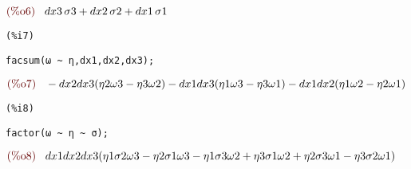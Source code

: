 \noindent
\begin{math}\displaystyle
\parbox{8ex}{\color{labelcolor}(\%o6) }
dx3\,\sigma3+dx2\,\sigma2+dx1\,\sigma1
\end{math}


\noindent
\begin{minipage}[t]{8ex}
\color{red}\bf
\begin{verbatim}
(%i7) 
\end{verbatim}
\end{minipage}
\begin{minipage}[t]{\textwidth}
\color{blue}
\begin{verbatim}
facsum(ω ~ η,dx1,dx2,dx3);
\end{verbatim}
\end{minipage}
\begin{math}\displaystyle
\parbox{8ex}{\color{labelcolor}(\%o7) }
-dx2dx3( \eta2\omega3-\eta3\omega2) -dx1dx3( \eta1\omega3-\eta3\omega1) -dx1dx2( \eta1\omega2-\eta2\omega1) 
\end{math}


\noindent
\begin{minipage}[t]{8ex}
\color{red}\bf
\begin{verbatim}
(%i8) 
\end{verbatim}
\end{minipage}
\begin{minipage}[t]{\textwidth}
\color{blue}
\begin{verbatim}
factor(ω ~ η ~ σ);
\end{verbatim}
\end{minipage}
\begin{math}\displaystyle
\parbox{8ex}{\color{labelcolor}(\%o8) }
dx1dx2dx3( \eta1\sigma2\omega3-\eta2\sigma1\omega3-\eta1\sigma3\omega2+\eta3\sigma1\omega2+\eta2\sigma3\omega1-\eta3\sigma2\omega1) 
\end{math}
